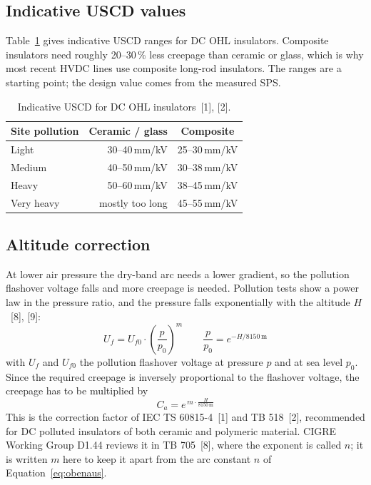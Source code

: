 \subsection{Indicative USCD values}
\label{sec:creepage-uscd}

Table~\ref{tab:uscd} gives indicative USCD ranges for DC OHL insulators.
Composite insulators need roughly 20--30\,\% less creepage than ceramic or
glass, which is why most recent HVDC lines use composite long-rod
insulators. The ranges are a starting point; the design value comes from the
measured SPS.

\begin{table}[!ht]
  \centering
  \begin{tabular}{@{}l r r@{}}
    \toprule
    \multicolumn{1}{c}{\textbf{Site pollution}}
      & \multicolumn{1}{c}{\textbf{Ceramic / glass}}
      & \multicolumn{1}{c}{\textbf{Composite}} \\
    \midrule
    Light      & 30--40\,mm/kV   & 25--30\,mm/kV \\
    Medium     & 40--50\,mm/kV   & 30--38\,mm/kV \\
    Heavy      & 50--60\,mm/kV   & 38--45\,mm/kV \\
    Very heavy & mostly too long & 45--55\,mm/kV \\
    \bottomrule
  \end{tabular}
  \caption{Indicative USCD for DC OHL insulators~[1], [2].}
  \label{tab:uscd}
\end{table}

\subsection{Altitude correction}
\label{sec:creepage-altitude}

At lower air pressure the dry-band arc needs a lower gradient, so the
pollution flashover voltage falls and more creepage is needed. Pollution
tests show a power law in the pressure ratio, and the pressure falls
exponentially with the altitude $H$~[8], [9]:
\begin{equation}
  U_{f} = U_{f0} \cdot \left(\frac{p}{p_{0}}\right)^{m}
  \qquad
  \frac{p}{p_{0}} = e^{-H/8150\,\mathrm{m}}
\end{equation}
with $U_{f}$ and $U_{f0}$ the pollution flashover voltage at pressure $p$ and
at sea level $p_{0}$. Since the required creepage is inversely proportional to
the flashover voltage, the creepage has to be multiplied by
\begin{equation}
  C_{a} = e^{\,m \cdot \frac{H}{8150\,\mathrm{m}}}
  \label{eq:altitude-full}
\end{equation}
This is the correction factor of IEC TS 60815-4~[1] and TB 518~[2],
recommended for DC polluted insulators of both ceramic and
polymeric material. CIGRE Working Group D1.44 reviews it in TB 705~[8],
where the exponent is called $n$; it is written $m$ here to keep it apart
from the arc constant $n$ of Equation~\eqref{eq:obenaus}.

